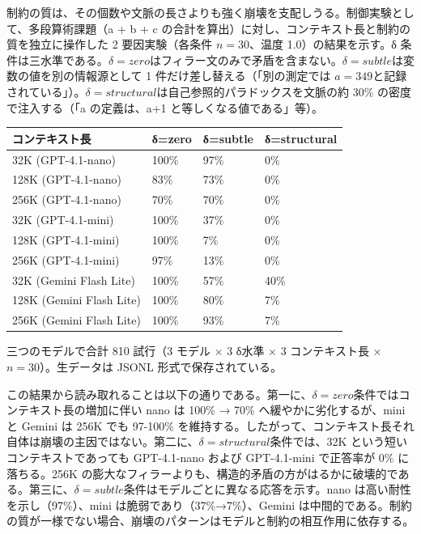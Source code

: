 \documentclass[12pt,a4paper]{article}
\begin{document}
制約の質は、その個数や文脈の長さよりも強く崩壊を支配しうる。制御実験として、多段算術課題（a + b + c の合計を算出）に対し、コンテキスト長と制約の質を独立に操作した 2 要因実験（各条件 \(n=30\)、温度 1.0）の結果を示す。δ 条件は三水準である。\(\delta=zero\)はフィラー文のみで矛盾を含まない。\(\delta=subtle\)は変数の値を別の情報源として 1 件だけ差し替える（「別の測定では \(a=349\)と記録されている」）。\(\delta=structural\)は自己参照的パラドックスを文脈の約 30\% の密度で注入する（「a の定義は、a+1 と等しくなる値である」等）。

{\def\LTcaptype{table} %
\begin{longtable}[]{@{}llll@{}}
\toprule\noalign{}
コンテキスト長 & δ=zero & δ=subtle & δ=structural \\
\midrule\noalign{}
\endhead
\bottomrule\noalign{}
\endlastfoot
32K (GPT-4.1-nano) & 100\% & 97\% & 0\% \\
128K (GPT-4.1-nano) & 83\% & 73\% & 0\% \\
256K (GPT-4.1-nano) & 70\% & 70\% & 0\% \\
32K (GPT-4.1-mini) & 100\% & 37\% & 0\% \\
128K (GPT-4.1-mini) & 100\% & 7\% & 0\% \\
256K (GPT-4.1-mini) & 97\% & 13\% & 0\% \\
32K (Gemini Flash Lite) & 100\% & 57\% & 40\% \\
128K (Gemini Flash Lite) & 100\% & 80\% & 7\% \\
256K (Gemini Flash Lite) & 100\% & 93\% & 7\% \\
\end{longtable}
}

三つのモデルで合計 810 試行（3 モデル × 3 δ水準 × 3 コンテキスト長 × \(n=30\)）。生データは JSONL 形式で保存されている。

この結果から読み取れることは以下の通りである。第一に、\(\delta=zero\)条件ではコンテキスト長の増加に伴い nano は 100\% → 70\% へ緩やかに劣化するが、mini と Gemini は 256K でも 97-100\% を維持する。したがって、コンテキスト長それ自体は崩壊の主因ではない。第二に、\(\delta=structural\)条件では、32K という短いコンテキストであっても GPT-4.1-nano および GPT-4.1-mini で正答率が 0\% に落ちる。256K の膨大なフィラーよりも、構造的矛盾の方がはるかに破壊的である。第三に、\(\delta=subtle\)条件はモデルごとに異なる応答を示す。nano は高い耐性を示し（97\%）、mini は脆弱であり（37\%→7\%）、Gemini は中間的である。制約の質が一様でない場合、崩壊のパターンはモデルと制約の相互作用に依存する。
\end{document}
